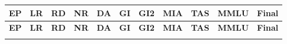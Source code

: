 \documentclass[11pt]{article}
\begin{document}
\begin{longtable}[h]{|r|r|l|l|l|l|l|r|r|l|r|}
\hline
\multicolumn{1}{|c|}{\textbf{EP}} & \multicolumn{1}{c|}{\textbf{LR}} & \multicolumn{1}{c|}{\textbf{RD}} & \multicolumn{1}{c|}{\textbf{NR}} & \multicolumn{1}{c|}{\textbf{DA}} & \multicolumn{1}{c|}{\textbf{GI}} & \multicolumn{1}{c|}{\textbf{GI2}} & \multicolumn{1}{c|}{\textbf{MIA}} & \multicolumn{1}{c|}{\textbf{TAS}} & \multicolumn{1}{c|}{\textbf{MMLU}} & \multicolumn{1}{c|}{\textbf{Final}} \\ 
\hline
\endfirsthead

\hline
\multicolumn{1}{|c|}{\textbf{EP}} & \multicolumn{1}{c|}{\textbf{LR}} & \multicolumn{1}{c|}{\textbf{RD}} & \multicolumn{1}{c|}{\textbf{NR}} & \multicolumn{1}{c|}{\textbf{DA}} & \multicolumn{1}{c|}{\textbf{GI}} & \multicolumn{1}{c|}{\textbf{GI2}} & \multicolumn{1}{c|}{\textbf{MIA}} & \multicolumn{1}{c|}{\textbf{TAS}} & \multicolumn{1}{c|}{\textbf{MMLU}} & \multicolumn{1}{c|}{\textbf{Final}} \\
\hline
\endhead

\hline
\endfoot


\end{longtable}
\end{document}

